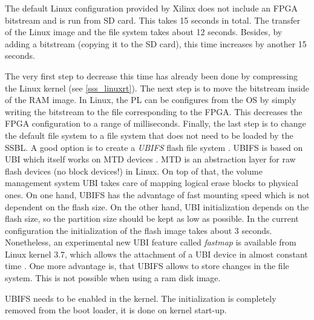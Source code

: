 The default Linux configuration provided by Xilinx does not include an \ac{FPGA} bitstream and is run from \ac{SD} card.
This takes 15 seconds in total.
The transfer of the Linux image and the file system takes about 12 seconds. 
Besides, by adding a bitstream (copying it to the \ac{SD} card), this time increases by another 15 seconds.   
\par
The very first step to decrease this time has already been done by compressing the Linux kernel (see \ref{sss_linuxrt}).
The next step is to move the bitstream inside of the \ac{RAM} image. 
In Linux, the \ac{PL} can be configures from the \ac{OS} by simply writing the bitstream to the file corresponding to the \ac{FPGA}. 
This decreases the \ac{FPGA} configuration to a range of milliseconds. 
Finally, the last step is to change the default file system to a file system that does not need to be loaded by the \ac{SSBL}.
A good option is to create a \textit{\ac{UBIFS}} flash file system \cite{ubifs}.
\ac{UBIFS} is based on \ac{UBI} which itself works on \ac{MTD} devices \cite{mtd}.
\ac{MTD} is an abstraction layer for raw flash devices (no block devices!) in Linux.
On top of that, the volume management system \ac{UBI} takes care of mapping logical erase blocks to physical ones.  
On one hand, \ac{UBIFS} has the advantage of fast mounting speed which is not dependent on the flash size.
On the other hand, \ac{UBI} initialization depends on the flash size, so the partition size should be kept as low as possible.
In the current configuration the initialization of the flash image takes about 3 seconds.
Nonetheless, an experimental new \ac{UBI} feature called \textit{fastmap} is available from Linux kernel 3.7, which allows the attachment of a \ac{UBI} device in almost constant time \cite{ubi}.
One more advantage is, that \ac{UBIFS} allows to store changes in the file system.
This is not possible when using a ram disk image.
\par
\ac{UBIFS} needs to be enabled in the kernel. 
The initialization is completely removed from the boot loader, it is done on kernel start-up.


